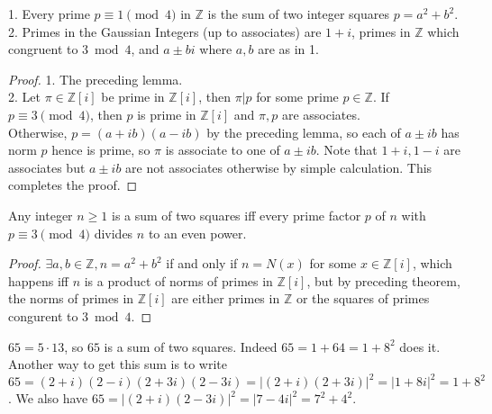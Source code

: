 \begin{theorem}
    1. Every prime $p\equiv 1\pmod{4}$ in $\mathbb Z$ is the sum of two integer squares $p=a^2+b^2$.\\
    2. Primes in the Gaussian Integers (up to associates) are $1+i$, primes in $\mathbb Z$ which congruent to $3\bmod{4}$, and $a\pm bi$ where $a,b$ are as in 1.
\end{theorem}
\begin{proof}
    1. The preceding lemma.\\
    2. Let $\pi\in\mathbb Z[i]$ be prime in $\mathbb Z[i]$, then $\pi|p$ for some prime $p\in\mathbb Z$.
    If $p\equiv 3\pmod{4}$, then $p$ is prime in $\mathbb Z[i]$ and $\pi,p$ are associates.\\
    Otherwise, $p=(a+ib)(a-ib)$ by the preceding lemma, so each of $a\pm ib$ has norm $p$ hence is prime, so $\pi$ is associate to one of $a\pm ib$.
    Note that $1+i,1-i$ are associates but $a\pm ib$ are not associates otherwise by simple calculation.
    This completes the proof.
\end{proof}
\begin{corollary}
    Any integer $n\ge 1$ is a sum of two squares iff every prime factor $p$ of $n$ with $p\equiv 3\pmod{4}$ divides $n$ to an even power.
\end{corollary}
\begin{proof}
    $\exists a,b\in\mathbb Z, n=a^2+b^2$ if and only if $n=N(x)$ for some $x\in\mathbb Z[i]$, which happens iff $n$ is a product of norms of primes in $\mathbb Z[i]$, but by preceding theorem, the norms of primes in $\mathbb Z[i]$ are either primes in $\mathbb Z$ or the squares of primes congurent to $3\bmod 4$.
\end{proof}
\begin{example}
    $65=5\cdot 13$, so $65$ is a sum of two squares.
    Indeed $65=1+64=1+8^2$ does it.
    Another way to get this sum is to write $65=(2+i)(2-i)(2+3i)(2-3i)=|(2+i)(2+3i)|^2=|1+8i|^2=1+8^2$.
    We also have $65=|(2+i)(2-3i)|^2=|7-4i|^2=7^2+4^2$.
\end{example}
